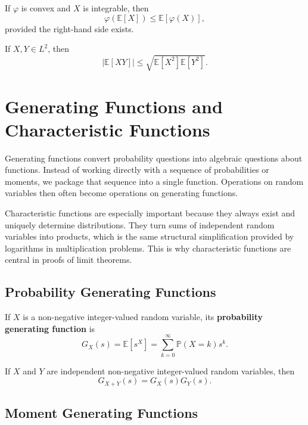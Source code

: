 \begin{theorem}
If $\varphi$ is convex and $X$ is integrable, then
\[
    \varphi(\mathbb{E}[X])\leq\mathbb{E}[\varphi(X)],
\]
provided the right-hand side exists.
\end{theorem}

\begin{theorem}
If $X,Y\in L^2$, then
\[
    |\mathbb{E}[XY]|\leq \sqrt{\mathbb{E}[X^2]\mathbb{E}[Y^2]}.
\]
\end{theorem}

\section{Generating Functions and Characteristic Functions}


Generating functions convert probability questions into algebraic questions about functions. Instead of working directly with a sequence of probabilities or moments, we package that sequence into a single function. Operations on random variables then often become operations on generating functions.

Characteristic functions are especially important because they always exist and uniquely determine distributions. They turn sums of independent random variables into products, which is the same structural simplification provided by logarithms in multiplication problems. This is why characteristic functions are central in proofs of limit theorems.

\subsection{Probability Generating Functions}

\begin{definition}
If $X$ is a non-negative integer-valued random variable, its \textbf{probability generating function} is
\[
    G_X(s)=\mathbb{E}[s^X]=\sum_{k=0}^{\infty}\mathbb{P}(X=k)s^k.
\]
\end{definition}

\begin{proposition}
If $X$ and $Y$ are independent non-negative integer-valued random variables, then
\[
    G_{X+Y}(s)=G_X(s)G_Y(s).
\]
\end{proposition}

\subsection{Moment Generating Functions}

